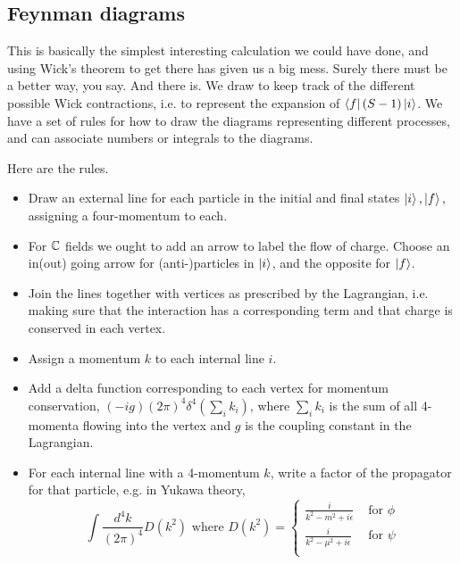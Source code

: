 
\subsection*{Feynman diagrams} This is basically the simplest interesting calculation we could have done, and using Wick's theorem to get there has given us a big mess. Surely there must be a better way, you say. And there is. We draw  to keep track of the different possible Wick contractions, i.e. to represent the expansion of $\left< f \right|(S-1)\left| i \right>$. We have a set of rules for how to draw the diagrams representing different processes, and can associate numbers or integrals to the diagrams.

Here are the rules.
\begin{itemize}
    \item Draw an external line for each particle in the initial and final states $\left| i \right>,\left| f \right>,$ assigning a four-momentum to each. 
    \item For $\mathbb{C}$ fields we ought to add an arrow to label the flow of charge. Choose an in(out) going arrow for (anti-)particles in $\left| i \right>$, and the opposite for $\left| f \right>$.
    \item Join the lines together with vertices as prescribed by the Lagrangian, i.e. making sure that the interaction has a corresponding term and that charge is conserved in each vertex.
    \item Assign a momentum $k$ to each internal line $i$.
    \item Add a delta function corresponding to each vertex for momentum conservation, $(-ig)(2\pi)^4 \delta^4(\sum_i k_i)$, where $\sum_i k_i$ is the sum of all 4-momenta flowing into the vertex and $g$ is the coupling constant in the Lagrangian.
    \item For each internal line with a 4-momentum $k$, write a factor of the propagator for that particle, e.g. in Yukawa theory,
    $$\int \frac{d^4k}{(2\pi)^4} D(k^2)\text{ where }D(k^2)=\begin{cases}
    \frac{i}{k^2-m^2+i\epsilon} & \text{ for }\phi\\
    \frac{i}{k^2-\mu^2+i\epsilon} & \text{ for }\psi\\
    \end{cases}$$
\end{itemize}

